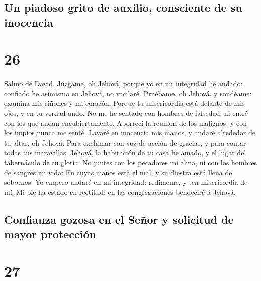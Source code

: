 \hypertarget{un-piadoso-grito-de-auxilio-consciente-de-su-inocencia}{%
\subsection{Un piadoso grito de auxilio, consciente de su
inocencia}\label{un-piadoso-grito-de-auxilio-consciente-de-su-inocencia}}

\hypertarget{section-25}{%
\section{26}\label{section-25}}

 Salmo de David. Júzgame, oh Jehová, porque yo en mi
integridad he andado: confiado he asimismo en Jehová, no vacilaré.
 Pruébame, oh Jehová, y sondéame: examina mis riñones y mi
corazón.  Porque tu misericordia está delante de mis ojos,
y en tu verdad ando.  No me he sentado con hombres de
falsedad; ni entré con los que andan encubiertamente. 
Aborrecí la reunión de los malignos, y con los impíos nunca me senté.
 Lavaré en inocencia mis manos, y andaré alrededor de tu
altar, oh Jehová:  Para exclamar con voz de acción de
gracias, y para contar todas tus maravillas.  Jehová, la
habitación de tu casa he amado, y el lugar del tabernáculo de tu gloria.
 No juntes con los pecadores mi alma, ni con los hombres
de sangres mi vida:  En cuyas manos está el mal, y su
diestra está llena de sobornos.  Yo empero andaré en mi
integridad: redímeme, y ten misericordia de mí.  Mi pie
ha estado en rectitud: en las congregaciones bendeciré á Jehová.

\hypertarget{confianza-gozosa-en-el-seuxf1or-y-solicitud-de-mayor-protecciuxf3n}{%
\subsection{Confianza gozosa en el Señor y solicitud de mayor
protección}\label{confianza-gozosa-en-el-seuxf1or-y-solicitud-de-mayor-protecciuxf3n}}

\hypertarget{section-26}{%
\section{27}\label{section-26}}

